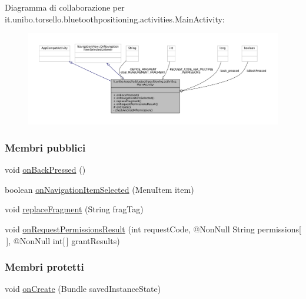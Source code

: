 Diagramma di collaborazione per it.\+unibo.\+torsello.\+bluetoothpositioning.\+activities.\+Main\+Activity\+:
\nopagebreak
\begin{figure}[H]
\begin{center}
\leavevmode
\includegraphics[width=350pt]{classit_1_1unibo_1_1torsello_1_1bluetoothpositioning_1_1activities_1_1MainActivity__coll__graph}
\end{center}
\end{figure}
\subsubsection*{Membri pubblici}
\begin{DoxyCompactItemize}
\item 
void \hyperlink{classit_1_1unibo_1_1torsello_1_1bluetoothpositioning_1_1activities_1_1MainActivity_ab0010b6d3fe518fabfea843626d7b5f1_ab0010b6d3fe518fabfea843626d7b5f1}{on\+Back\+Pressed} ()
\item 
boolean \hyperlink{classit_1_1unibo_1_1torsello_1_1bluetoothpositioning_1_1activities_1_1MainActivity_a7cfc0a2ee94c12afaac3b7472eeb75b7_a7cfc0a2ee94c12afaac3b7472eeb75b7}{on\+Navigation\+Item\+Selected} (Menu\+Item item)
\item 
void \hyperlink{classit_1_1unibo_1_1torsello_1_1bluetoothpositioning_1_1activities_1_1MainActivity_a98db4478d28cd91118138d0b652ceb2c_a98db4478d28cd91118138d0b652ceb2c}{replace\+Fragment} (String frag\+Tag)
\item 
void \hyperlink{classit_1_1unibo_1_1torsello_1_1bluetoothpositioning_1_1activities_1_1MainActivity_a81d7581dfa4998b2ad8139f103328cf9_a81d7581dfa4998b2ad8139f103328cf9}{on\+Request\+Permissions\+Result} (int request\+Code, @Non\+Null String permissions\mbox{[}$\,$\mbox{]}, @Non\+Null int\mbox{[}$\,$\mbox{]} grant\+Results)
\end{DoxyCompactItemize}
\subsubsection*{Membri protetti}
\begin{DoxyCompactItemize}
\item 
void \hyperlink{classit_1_1unibo_1_1torsello_1_1bluetoothpositioning_1_1activities_1_1MainActivity_a8ffa5fa91fb4ae13a758a12682872a79_a8ffa5fa91fb4ae13a758a12682872a79}{on\+Create} (Bundle saved\+Instance\+State)
\end{DoxyCompactItemize}
